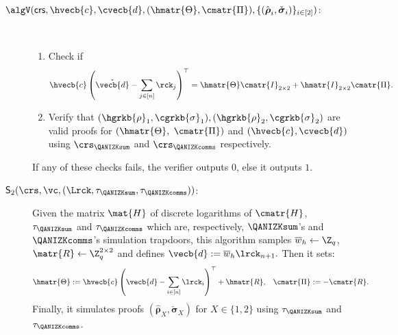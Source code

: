 \begin{description}
\item[$\algV(
    \mathsf{crs},
    \hvecb{c},
   \cvecb{d},
        (\hmatr{\Theta}, \cmatr{\Pi}), 
        \{(\hat{\boldsymbol \rho}_{i}, \check{\boldsymbol \sigma}_{i})\}_{i \in [2]} )$:] ~
%   
\begin{enumerate}
\item Check if 
\begin{equation}\label{eq:ver1}\hvecb{c}
\left(
    \check{\vecb{d}}-
    \sum_{j \in [n]} \rck_{j}
\right)^{\top} =
    \hmatr{\Theta} \cmatr{I}_{2 \times 2} +
    \hmatr{I}_{2 \times 2}\cmatr{\Pi}.
    \end{equation}  
  \item Verify that $(\hgrkb{\rho}_1, \cgrkb{\sigma}_1),(\hgrkb{\rho}_{2},\cgrkb{\sigma}_2)$ are valid proofs for %
  $(\hmatr{\Theta},$ $\cmatr{\Pi})$
        and $(\hvecb{c},\cvecb{d})$ using $\crs_\QANIZKsum$ and $\crs_\QANIZKcomms$ respectively.
\end{enumerate}
If any of these checks fails, the verifier outputs $0$, else it outputs $1$. \\

\item[$\mathsf{S}_2(\crs,\vc,\left(\Lrck,\tau_\QANIZKsum, \tau_\QANIZKcomms\right))$:]  Given the matrix $\mat{H}$ of discrete logarithms of $\cmatr{H}$, $\tau_\QANIZKsum$ and $\tau_\QANIZKcomms$ which are, respectively, $\QANIZKsum$'s and $\QANIZKcomms$'s simulation trapdoors, this algorithm samples 
$\overline{w}_h \gets \Z_q$, $\matr{R} \gets \Z_q^{2 \times 2}$ and defines 
 $\vecb{d}:= \overline{w}_{h} \lrck_{n+1}.$
 Then it sets:
\begin{align*} 
\hmatr{\Theta} & :=  \hvecb{c}\left(\vecb{d}-\sum_{i \in [n]} \lrck_i\right)^\top + \hmatr{R},
    &
    \cmatr{\Pi} & := - \cmatr{R}.
\end{align*}
Finally, it simulates proofs $(\hat{\boldsymbol \rho}_{X},
  \check{\boldsymbol \sigma}_{X})$
for $X \in \{1,2\}$  using $\tau_\QANIZKsum$ and $\tau_\QANIZKcomms$.
\end{description}

